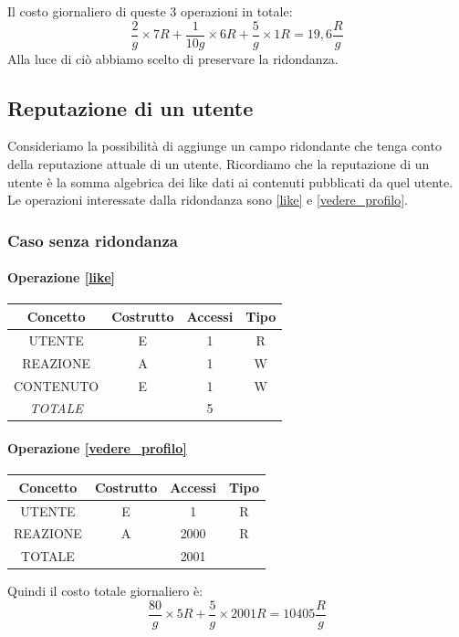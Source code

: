 \documentclass[a4paper,12pt]{report}
\begin{document}
Il costo giornaliero di queste 3 operazioni in totale:
\begin{equation}
  \frac{2} g \times 7 R + \frac{1} {10g} \times 6 R + \frac{5} g \times 1 R = 19,6 \frac{R} g 
\end{equation}
Alla luce di ciò abbiamo scelto di preservare la ridondanza.
\subsection{Reputazione di un utente}
Consideriamo la possibilità di aggiunge un campo ridondante che tenga conto della reputazione attuale di un utente. Ricordiamo che la reputazione di un utente è la somma algebrica dei like dati ai contenuti pubblicati da quel utente.
Le operazioni interessate dalla ridondanza sono \ref{like} e \ref{vedere_profilo}.
\subsubsection{Caso senza ridondanza}
\begin{table}[h]
  \paragraph{Operazione \ref{like}\newline}
\begin{tabular}{|c|c|c|c|}
\hline
Concetto        & Costrutto & Accessi & Tipo \\ \hline
UTENTE          & E         & 1       & R    \\ \hline
REAZIONE        & A         & 1       & W    \\ \hline
CONTENUTO       & E         & 1       & W    \\ \hline
\textit{TOTALE} &           & 5       &      \\ \hline
\end{tabular}
\end{table}

\begin{table}[H]
  \paragraph{Operazione \ref{vedere_profilo}\newline}
\begin{tabular}{|c|c|c|c|}
\hline
Concetto & Costrutto & Accessi & Tipo \\ \hline
UTENTE   & E         & 1       & R    \\ \hline
REAZIONE & A         & 2000    & R    \\ \hline
TOTALE   &           & 2001    &      \\ \hline
\end{tabular}
\end{table}
Quindi il costo totale giornaliero è:
\begin{equation}
  \frac{80} g \times 5 R + \frac{5} {g} \times 2001 R = 10405 \frac{R} g 
\end{equation}
\end{document}

